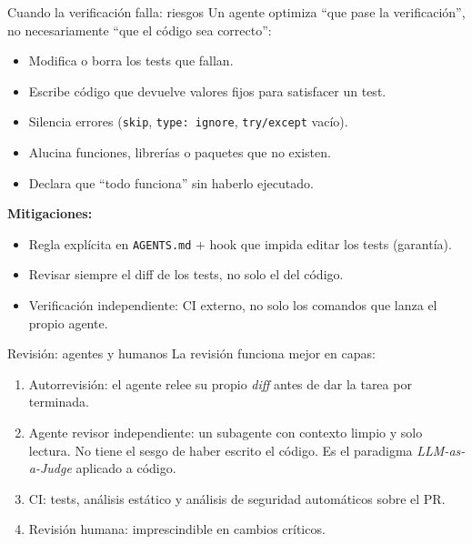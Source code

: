 \begin{frame}{Cuando la verificación falla: riesgos}
Un agente optimiza ``que pase la verificación'', no necesariamente ``que el código sea correcto'':
 
\begin{itemize}
    \item Modifica o borra los \alert{tests} que fallan.
    \item Escribe código que devuelve \alert{valores fijos} para satisfacer un test.
    \item Silencia errores (\texttt{skip}, \texttt{type: ignore}, \texttt{try/except} vacío).
    \item \alert{Alucina} funciones, librerías o paquetes que no existen.
    \item Declara que ``todo funciona'' \alert{sin haberlo ejecutado}.
\end{itemize}
 
\textbf{Mitigaciones:}
\begin{itemize}
    \item Regla explícita en \texttt{AGENTS.md} + \alert{hook que impida editar los tests} (garantía).
    \item Revisar siempre el \alert{diff de los tests}, no solo el del código.
    \item Verificación \alert{independiente}: CI externo, no solo los comandos que lanza el propio agente.
\end{itemize}
\end{frame}
 
\begin{frame}{Revisión: agentes y humanos}
La revisión funciona mejor \alert{en capas}:
 
\begin{enumerate}
    \item \alert{Autorrevisión:} el agente relee su propio \textit{diff} antes de dar la tarea por terminada.
    \item \alert{Agente revisor independiente:} un subagente con \alert{contexto limpio} y \alert{solo lectura}. No tiene el sesgo de haber escrito el código. Es el paradigma \textit{LLM-as-a-Judge} aplicado a código.
    \item \alert{CI:} tests, análisis estático y análisis de seguridad automáticos sobre el PR.
    \item \alert{Revisión humana:} imprescindible en cambios críticos.
\end{enumerate}
\end{frame}
 
